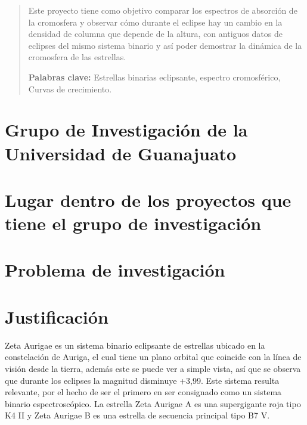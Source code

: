 \documentclass[11pt]{article}
\begin{document}
\newpage
\begin{abstract}
Este proyecto tiene como objetivo comparar los espectros de absorción de la cromosfera y observar cómo durante el eclipse hay un cambio en la densidad de columna que depende de la altura, con antiguos datos de eclipses del mismo sistema binario y así poder demostrar la dinámica de la cromosfera de las estrellas.

\vspace{0.5cm}
\textbf{Palabras clave:} Estrellas binarias eclipsante, espectro cromosférico, Curvas de crecimiento.

\end{abstract}


\begin{figure}
  \centering

  \label{Figura 1}
\end{figure}


\section{Grupo de Investigación de la Universidad de Guanajuato}

\section{Lugar dentro de los proyectos que tiene el grupo de investigación}

\section{Problema de investigación}
\section{Justificación}
Zeta Aurigae es un sistema binario eclipsante de estrellas ubicado en la constelación de Auriga, el cual tiene un plano orbital que coincide con la línea de visión desde la tierra, además este se puede ver a simple vista, así que se observa que durante los eclipses la magnitud disminuye +3,99. Este sistema resulta relevante, por el hecho de ser el primero en ser consignado como un sistema binario espectroscópico. La estrella Zeta Aurigae A es una supergigante roja tipo K4 II y Zeta Aurigae B es una estrella de secuencia principal tipo B7 V.
\vspace{3mm}
\end{document}
